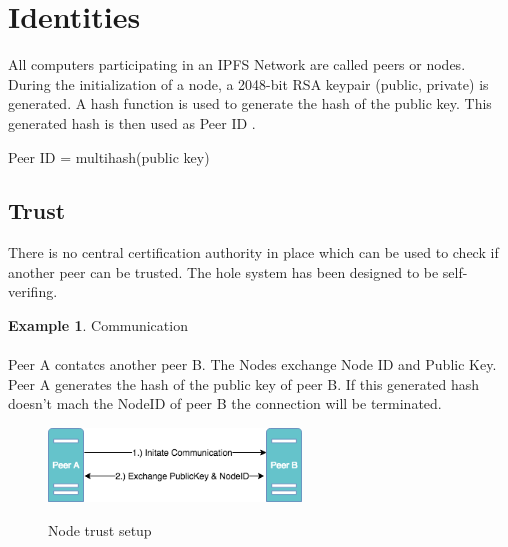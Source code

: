 \documentclass[a4paper,11pt, oneside]{report}
\theoremstyle{definition}
\newtheorem{exmp}{Example}[subsection]
\begin{document}

\newpage
\section{Identities}
All computers participating in an IPFS Network are called peers or nodes.\\
During the initialization of a node, a 2048-bit RSA keypair (public, private) is generated. A hash function is used to generate the hash of the public key. This generated hash is then used as Peer ID \cite{PeerID}.
\begin{center}
Peer ID = multihash(public key)
\end{center}

\subsection{Trust}
There is no central certification authority in place which can be used to check if another peer can be trusted. The hole system has been designed to be self-verifing.\\[0.3cm]
\begin{exmp} Communication\\ \\
Peer A contatcs another peer B. The Nodes exchange Node ID and Public Key.
Peer A generates the hash of the public key of peer B. If this generated hash doesn't mach the NodeID of peer B the connection will be terminated.\\[0.3cm]
\begin{figure}[H]
\centering
\includegraphics[width=0.6\textwidth]{img/ipfs_peerstrust_scenario_a.png}\\[0.8cm]
\caption[Node trust]{Node trust setup}
\end{figure}
\end{exmp}
\newpage
\end{document}
